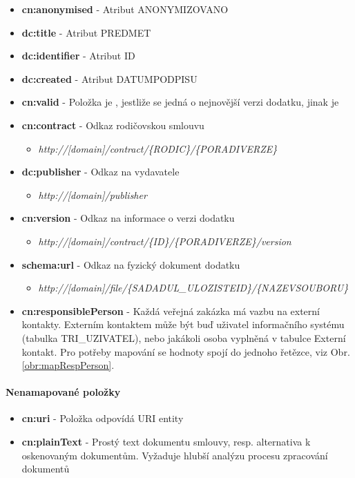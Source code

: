 \begin{itemize}
\item \textbf{cn:anonymised} - Atribut ANONYMIZOVANO
\item \textbf{dc:title} - Atribut PREDMET
\item \textbf{dc:identifier} - Atribut ID
\item \textbf{dc:created} - Atribut DATUMPODPISU
\item \textbf{cn:valid} - Položka je , jestliže se jedná o nejnovější verzi dodatku, jinak je 
\item \textbf{cn:contract} - Odkaz rodičovskou smlouvu
	\begin{itemize}
	\item \textit{http://[domain]/contract/\{RODIC\}/\{PORADIVERZE\}}
	\end{itemize}
\item \textbf{dc:publisher} - Odkaz na vydavatele
	\begin{itemize}
	\item \textit{http://[domain]/publisher}
	\end{itemize}
\item \textbf{cn:version} - Odkaz na informace o verzi dodatku
	\begin{itemize}
	\item \textit{http://[domain]/contract/\{ID\}/\{PORADIVERZE\}/version}
	\end{itemize}
\item \textbf{schema:url} - Odkaz na fyzický dokument dodatku
	\begin{itemize}
	\item \textit{http://[domain]/file/\{SADADUL\_ULOZISTEID\}/\{NAZEVSOUBORU\}}
	\end{itemize}
\item \textbf{cn:responsiblePerson} - Každá veřejná zakázka má vazbu na externí kontakty. Externím kontaktem může být buď uživatel informačního systému (tabulka TRI\_UZIVATEL), nebo jakákoli osoba vyplněná v tabulce Externí kontakt. Pro potřeby mapování se hodnoty spojí do jednoho řetězce, viz Obr. \ref{obr:mapRespPerson}.
\end{itemize}

\paragraph*{Nenamapované položky}
\begin{itemize}
\item \textbf{cn:uri} - Položka odpovídá URI entity
\item \textbf{cn:plainText} - Prostý text dokumentu smlouvy, resp. alternativa k oskenovaným dokumentům. Vyžaduje hlubší analýzu procesu zpracování dokumentů 
\end{itemize}

